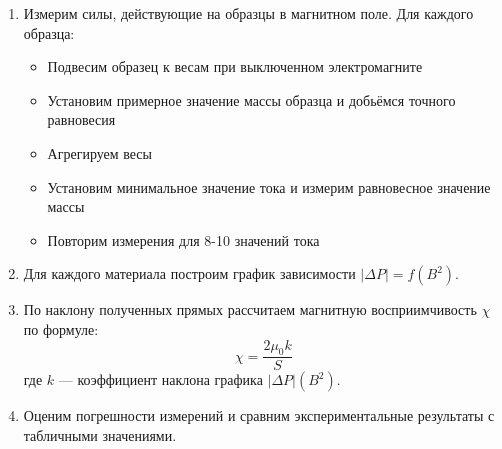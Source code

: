 \documentclass[a4paper]{article}
\begin{document}
\begin{enumerate}
    \item Измерим силы, действующие на образцы в магнитном поле. Для каждого образца:
    \begin{itemize}
        \item Подвесим образец к весам при выключенном электромагните
        \item Установим примерное значение массы образца и добьёмся точного равновесия
        \item Агрегируем весы
        \item Установим минимальное значение тока и измерим равновесное значение массы
        \item Повторим измерения для 8-10 значений тока
    \end{itemize}
    
    \item Для каждого материала построим график зависимости $|\Delta P| = f(B^2)$.
    
    \item По наклону полученных прямых рассчитаем магнитную восприимчивость $\chi$ по формуле:
    \[
    \chi = \frac{2\mu_0 k}{S}
    \]
    где $k$ --- коэффициент наклона графика $|\Delta P|(B^2)$.
    
    \item Оценим погрешности измерений и сравним экспериментальные результаты с табличными значениями.



\end{enumerate}
\end{document}
